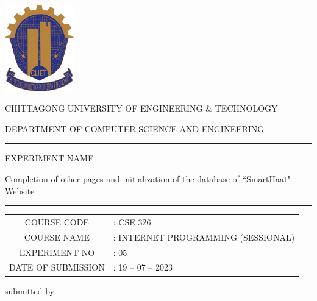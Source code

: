 \documentclass[a4paper,12pt]{report}
\begin{document}
\begin{titlepage}

	\centering

	\includegraphics[width=3cm, keepaspectratio]{cuet.png} \par \vspace{0.5cm}
	\begin{Large}
		CHITTAGONG UNIVERSITY OF ENGINEERING \& TECHNOLOGY
	\end{Large}
	\par
	\vspace{.5cm}
	{DEPARTMENT OF COMPUTER SCIENCE AND ENGINEERING}
\vspace{1cm}

	\raisebox{-\baselineskip}{\rule{\textwidth}{1px}}
	\rule{\textwidth}{1px}

\vspace{0.2cm}
{\Large{{EXPERIMENT NAME}}}\par \vspace{0.3cm}
\huge{{Completion of other pages and initialization of the database of ``SmartHaat" Website}}
	\rule{\textwidth}{2px}

\vspace{0.5cm}

	\normalsize
\begin{tabular}{cl}
COURSE CODE        & : CSE 326                          \\
COURSE NAME        & : INTERNET PROGRAMMING (SESSIONAL) \\
EXPERIMENT NO      & : 05                               \\
DATE OF SUBMISSION & : 19 -- 07 -- 2023
\end{tabular}
\vspace{0.5cm}

	\parbox[l]{9cm}{
		\begin{center}
			submitted by
		\end{center}

}
\end{titlepage}
\end{document}

